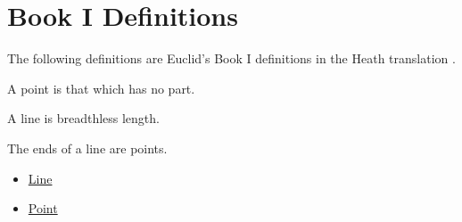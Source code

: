 % 
% 
% 
% 
% 
% 
% 
% 

\clearpage

\section{Book I Definitions}

The following definitions are Euclid's Book I definitions in the Heath
translation \citep[Book I, Definitions 1--23]{euclid-elements-heath}.

\begin{definition}[Point]
\label{def:euclid-point}
A point is that which has no part.
\end{definition}
\begin{lra-not-visible}
\NoLocalDependencies
\end{lra-not-visible}

\begin{definition}[Line]
\label{def:euclid-line}
A line is breadthless length.
\end{definition}
\begin{lra-not-visible}
\NoLocalDependencies
\end{lra-not-visible}

\begin{definition}
\label{def:euclid-ends-of-a-line}
The ends of a line are points.
\end{definition}
\begin{lra-not-visible}
\begin{dependencies}
\begin{itemize}
  \item \hyperref[def:euclid-line]{Line}
  \item \hyperref[def:euclid-point]{Point}
\end{itemize}
\end{dependencies}
\end{lra-not-visible}

